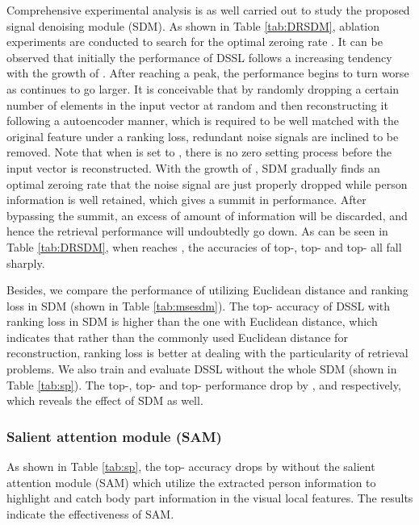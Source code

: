 \documentclass[sigconf]{acmart}
\begin{document}
Comprehensive experimental analysis is as well carried out to study the proposed signal denoising module (SDM). As shown in Table \ref{tab:DRSDM}, ablation experiments are conducted to search for the optimal zeroing rate . It can be observed that initially the performance of DSSL follows a increasing tendency with the growth of . After reaching a peak, the performance begins to turn worse as  continues to go larger. It is conceivable that by randomly dropping a certain number of elements in the input vector at random and then reconstructing it following a autoencoder manner, which is required to be well matched with the original feature under a ranking loss, redundant noise signals are inclined to be removed. Note that when  is set to , there is no zero setting process before the input vector is reconstructed. With the growth of , SDM gradually finds an optimal zeroing rate that the noise signal are just properly dropped while person information is well retained, which gives a summit in performance. After bypassing the summit, an excess of amount of information will be discarded, and hence the retrieval performance will undoubtedly go down. As can be seen in Table \ref{tab:DRSDM}, when  reaches , the accuracies of top-, top- and top- all fall sharply.

Besides, we compare the performance of utilizing Euclidean distance and ranking loss in SDM (shown in Table \ref{tab:msesdm}). The top- accuracy of DSSL with ranking loss in SDM is  higher than the one with Euclidean distance, which indicates that rather than the commonly used Euclidean distance for reconstruction, ranking loss is better at dealing with the particularity of retrieval problems. We also train and evaluate DSSL without the whole SDM (shown in Table \ref{tab:sp}). The top-, top- and top- performance drop by ,  and  respectively, which reveals the effect of SDM as well.

\subsubsection{Salient attention module (SAM)}
As shown in Table \ref{tab:sp}, the top- accuracy drops by  without the salient attention module (SAM) which utilize the extracted person information to highlight and catch body part information in the visual local features. The results indicate the effectiveness of SAM.
\end{document}
